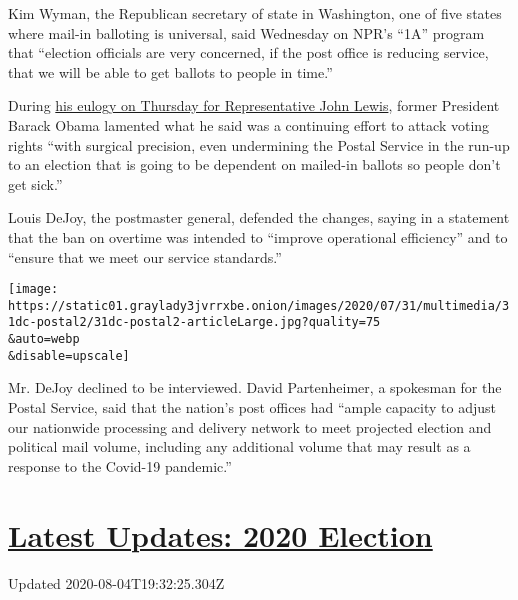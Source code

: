 Kim Wyman, the Republican secretary of state in Washington, one of five
states where mail-in balloting is universal, said Wednesday on NPR's
``1A'' program that ``election officials are very concerned, if the post
office is reducing service, that we will be able to get ballots to
people in time.''

During
\href{https://www.nytimes3xbfgragh.onion/2020/07/30/us/obama-eulogy-john-lewis-full-transcript.html}{his
eulogy on Thursday for Representative John Lewis}, former President
Barack Obama lamented what he said was a continuing effort to attack
voting rights ``with surgical precision, even undermining the Postal
Service in the run-up to an election that is going to be dependent on
mailed-in ballots so people don't get sick.''

Louis DeJoy, the postmaster general, defended the changes, saying in a
statement that the ban on overtime was intended to ``improve operational
efficiency'' and to ``ensure that we meet our service standards.''

\texttt{[image: https://static01.graylady3jvrrxbe.onion/images/2020/07/31/multimedia/31dc-postal2/31dc-postal2-articleLarge.jpg?quality=75\\\&auto=webp\\\&disable=upscale]}

Mr. DeJoy declined to be interviewed. David Partenheimer, a spokesman
for the Postal Service, said that the nation's post offices had ``ample
capacity to adjust our nationwide processing and delivery network to
meet projected election and political mail volume, including any
additional volume that may result as a response to the Covid-19
pandemic.''

\hypertarget{latest-updates-2020-election}{%
\section{\texorpdfstring{\href{https://www.nytimes3xbfgragh.onion/2020/08/04/us/elections/primary-election-michigan-arizona-kansas.html?action=click\&pgtype=Article\&state=default\&region=MAIN_CONTENT_1\&context=storylines_live_updates}{Latest
Updates: 2020
Election}}{Latest Updates: 2020 Election}}\label{latest-updates-2020-election}}

Updated 2020-08-04T19:32:25.304Z

